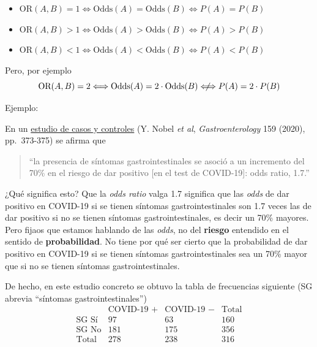 \documentclass[
  spanish,
  letterpaper,
  DIV=11,
  numbers=noendperiod]{scrreprt}
\begin{document}
\begin{tcolorbox}
\begin{itemize}
\item
  \(\text{OR}(A,B)=1\Longleftrightarrow \text{Odds}(A)=\text{Odds}(B) \Longleftrightarrow P(A)=P(B)\)
\item
  \(\text{OR}(A,B)>1\Longleftrightarrow \text{Odds}(A)>\text{Odds}(B) \Longleftrightarrow P(A)>P(B)\)
\item
  \(\text{OR}(A,B)<1\Longleftrightarrow \text{Odds}(A)<\text{Odds}(B) \Longleftrightarrow P(A)<P(B)\)
\end{itemize}

Pero, por ejemplo \[
\text{OR}(A,B)=2 \Longleftrightarrow \text{Odds}(A)= 2\cdot \text{Odds}(B) \hspace{1.2ex}
\not\hspace{-1.2ex}\Longleftrightarrow P(A)=
2\cdot P(B)
\]

Ejemplo:

En un
\href{https://www.gastrojournal.org/article/S0016-5085(20)30490-X/fulltext}{estudio
de casos y controles} (Y. Nobel \emph{et al}, \emph{Gastroenterology}
159 (2020), pp.~373-375) se afirma que

\begin{quote}
``la presencia de síntomas gastrointestinales se asoció a un incremento
del 70\% en el riesgo de dar positivo {[}en el test de COVID-19{]}: odds
ratio, 1.7.''
\end{quote}

¿Qué significa esto? Que la \emph{odds ratio} valga 1.7 significa que
las \emph{odds} de dar positivo en COVID-19 si se tienen síntomas
gastrointestinales son 1.7 veces las de dar positivo si no se tienen
síntomas gastrointestinales, es decir un 70\% mayores. Pero fijaos que
estamos hablando de las \emph{odds}, no del \textbf{riesgo} entendido en
el sentido de \textbf{probabilidad}. No tiene por qué ser cierto que la
probabilidad de dar positivo en COVID-19 si se tienen síntomas
gastrointestinales sea un 70\% mayor que si no se tienen síntomas
gastrointestinales.

De hecho, en este estudio concreto se obtuvo la tabla de frecuencias
siguiente (SG abrevia ``síntomas gastrointestinales'') \[
\begin{array}{r|c|c|c}
& \text{COVID-19 } + & \text{COVID-19 } - & \text{Total}\\ \hline
\text{SG Sí} & 97&  63 & 160\\\hline
\text{SG No}  & 181 &   175 & 356\\\hline
\text{Total} & 278 & 238 &  316
\end{array}
\]


\end{tcolorbox}
\end{document}

